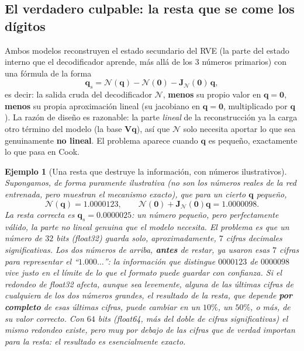 \documentclass[11pt,a4paper]{article}
\newtheorem{ejemplo}{Ejemplo}
\begin{document}
\subsection{El verdadero culpable: la resta que se come los d\'igitos}
\label{sec:appB-cancellation}

Ambos modelos reconstruyen el estado secundario del RVE (la parte del
estado interno que el decodificador aprende, m\'as all\'a de los $3$
n\'umeros primarios) con una f\'ormula de la forma
\[
 \bm q_s = \mathcal N(\bm q) - \mathcal N(\bm 0) - \bm J_{\mathcal
 N}(\bm 0)\,\bm q,
\]
es decir: la salida cruda del decodificador $\mathcal N$, \textbf{menos}
su propio valor en $\bm q=\bm0$, \textbf{menos} su propia aproximaci\'on
lineal (su jacobiano en $\bm q=\bm0$, multiplicado por $\bm q$). La
raz\'on de dise\~no es razonable: la parte \emph{lineal} de la
reconstrucci\'on ya la carga otro t\'ermino del modelo (la base
$\mathbf V\bm q$), as\'i que $\mathcal N$ solo necesita aportar lo que
sea genuinamente \textbf{no lineal}. El problema aparece cuando $\bm q$
es peque\~no, exactamente lo que pasa en Cook.

\begin{ejemplo}[Una resta que destruye la informaci\'on, con n\'umeros ilustrativos]
Supongamos, de forma puramente ilustrativa (no son los n\'umeros reales
de la red entrenada, pero muestran el mecanismo exacto), que para un
cierto $\bm q$ peque\~no,
\[
 \mathcal N(\bm q) = 1.0000123,\qquad \mathcal N(\bm0)+\bm J_{\mathcal
 N}(\bm 0)\bm q = 1.0000098.
\]
La resta correcta es $\bm q_s=0.0000025$: un n\'umero peque\~no,
pero perfectamente v\'alido, la parte no lineal genuina que el modelo
necesita. El problema es que un n\'umero de $32$ bits (float32) guarda
solo, aproximadamente, $7$ cifras decimales significativas. Los dos
n\'umeros de arriba, \textbf{antes} de restar, ya usaron esas $7$ cifras
para representar el ``$1.000\ldots$'': la informaci\'on que distingue
$0000123$ de $0000098$ vive justo en el l\'imite de lo que el formato
puede guardar con confianza. Si el redondeo de float32 afecta, aunque
sea levemente, alguna de las \'ultimas cifras de cualquiera de los dos
n\'umeros grandes, el resultado de la resta, que depende \textbf{por
completo} de esas \'ultimas cifras, puede cambiar en un $10\%$, un
$50\%$, o m\'as, de su valor correcto. Con $64$ bits (float64, m\'as del
doble de cifras significativas) el mismo redondeo existe, pero muy por
debajo de las cifras que de verdad importan para la resta: el resultado
es esencialmente exacto.
\end{ejemplo}
\end{document}
